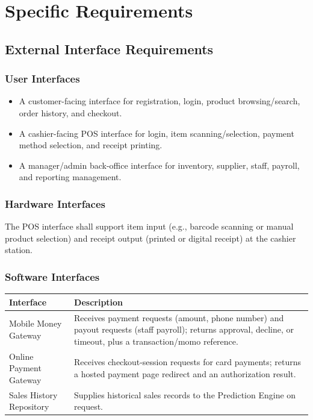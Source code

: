 \documentclass[11pt,a4paper]{report}
\begin{document}
\chapter{Specific Requirements}

\section{External Interface Requirements}

\subsection{User Interfaces}
\begin{itemize}[itemsep=2pt]
    \item A customer-facing interface for registration, login, product browsing/search, order history, and checkout.
    \item A cashier-facing POS interface for login, item scanning/selection, payment method selection, and receipt printing.
    \item A manager/admin back-office interface for inventory, supplier, staff, payroll, and reporting management.
\end{itemize}

\subsection{Hardware Interfaces}
The POS interface shall support item input (e.g., barcode scanning or manual product selection) and receipt output (printed or digital receipt) at the cashier station.

\subsection{Software Interfaces}
\begin{longtable}{L{4cm} L{10cm}}
\toprule
\textbf{Interface} & \textbf{Description} \\
\midrule
\endhead
Mobile Money Gateway & Receives payment requests (amount, phone number) and payout requests (staff payroll); returns approval, decline, or timeout, plus a transaction/momo reference. \\
Online Payment Gateway & Receives checkout-session requests for card payments; returns a hosted payment page redirect and an authorization result. \\
Sales History Repository & Supplies historical sales records to the Prediction Engine on request. \\
\bottomrule
\end{longtable}
\end{document}
